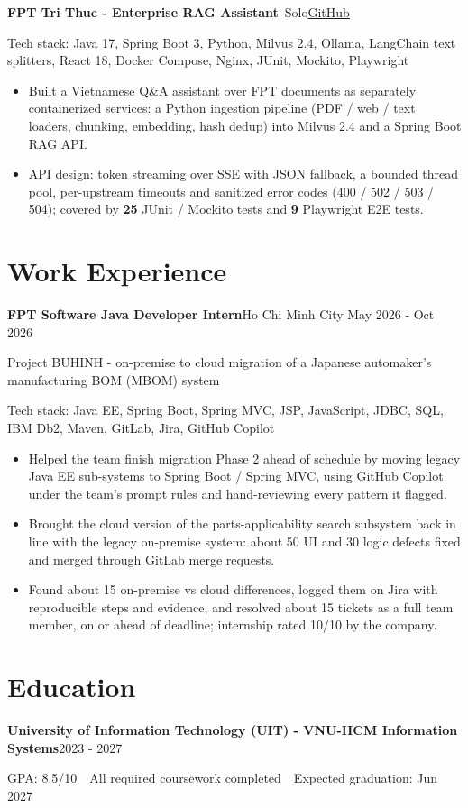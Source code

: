 \documentclass[10pt, a4paper]{article}
\newcommand{\entry}[2]{\textbf{#1}\hfill#2\par}
\newcommand{\subentry}[2]{{\color{MutedText}#1}\hfill{\color{MutedText}#2}\par}
\newcommand{\project}[3]{\textbf{#1}\,{\color{MutedText}\textbar{} #2}\hfill\href{#3}{GitHub}\par}
\newcommand{\techstack}[1]{{\color{MutedText}Tech stack: #1}\par}
\begin{document}
\project{FPT Tri Thuc - Enterprise RAG Assistant}{Solo}{https://github.com/minhphuong150505/milvus-rag-demo}
\techstack{Java 17, Spring Boot 3, Python, Milvus 2.4, Ollama, LangChain text splitters, React 18, Docker Compose, Nginx, JUnit, Mockito, Playwright}
\begin{itemize}
  \item Built a Vietnamese Q\&A assistant over FPT documents as separately containerized services: a Python ingestion pipeline (PDF / web / text loaders, chunking, embedding, hash dedup) into Milvus 2.4 and a Spring Boot RAG API.
  \item API design: token streaming over SSE with JSON fallback, a bounded thread pool, per-upstream timeouts and sanitized error codes (400 / 502 / 503 / 504); covered by \textbf{25} JUnit / Mockito tests and \textbf{9} Playwright E2E tests.
\end{itemize}

\section{Work Experience}
\entry{FPT Software \textbar{} Java Developer Intern}{Ho Chi Minh City \textbar{} May 2026 - Oct 2026}
\subentry{Project BUHINH - on-premise to cloud migration of a Japanese automaker's manufacturing BOM (MBOM) system}{}
\techstack{Java EE, Spring Boot, Spring MVC, JSP, JavaScript, JDBC, SQL, IBM Db2, Maven, GitLab, Jira, GitHub Copilot}
\begin{itemize}
  \item Helped the team finish migration Phase 2 ahead of schedule by moving legacy Java EE sub-systems to Spring Boot / Spring MVC, using GitHub Copilot under the team's prompt rules and hand-reviewing every pattern it flagged.
  \item Brought the cloud version of the parts-applicability search subsystem back in line with the legacy on-premise system: about 50 UI and 30 logic defects fixed and merged through GitLab merge requests.
  \item Found about 15 on-premise vs cloud differences, logged them on Jira with reproducible steps and evidence, and resolved about 15 tickets as a full team member, on or ahead of deadline; internship rated 10/10 by the company.
\end{itemize}

\section{Education}
\entry{University of Information Technology (UIT) - VNU-HCM \textbar{} Information Systems}{2023 - 2027}
GPA: 8.5/10 \,\textbar\, All required coursework completed \,\textbar\, Expected graduation: Jun 2027\par
\end{document}
